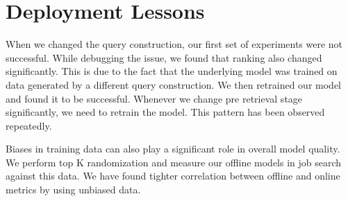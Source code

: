 \section{Deployment Lessons}

When we changed the query construction, our first set of experiments were not
successful. While debugging the issue, we found that ranking also changed
significantly. This is due to the fact that the underlying model was trained on
data generated by a different query construction. We then retrained our
model and found it to be successful. Whenever we change pre retrieval stage
significantly, we need to retrain the model. This pattern has been observed
repeatedly.

Biases in training data can also play a significant role in overall model
quality. We perform top K randomization and measure our offline models in job
search against this data. We have found tighter correlation between offline and
online metrics by using unbiased data.
